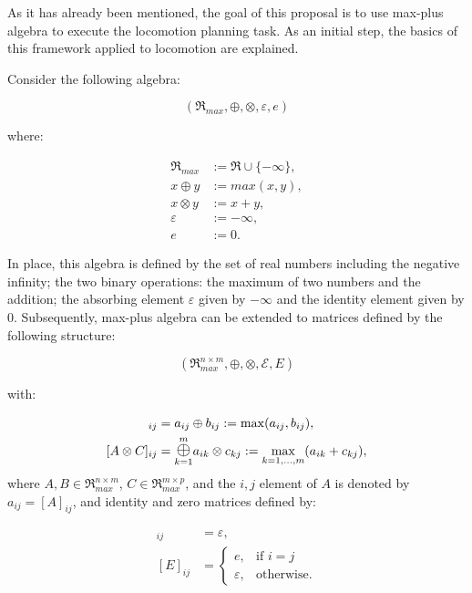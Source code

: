 \documentclass[main.tex]{subfiles}
\begin{document}
	
	As it has already been mentioned, the goal of this proposal is to use max-plus algebra to execute the locomotion planning task. As an initial step, the basics of this framework applied to locomotion are explained.
	
	Consider the following algebra:
	
	\begin{equation}
		(\Re_{max}, \oplus, \otimes, \varepsilon, e)
	\end{equation}
	
	where:
	
	\begin{align}
		\Re_{max} &:= \Re \cup \{-\infty\}, \nonumber\\
		x \oplus y &:= max(x,y), \nonumber\\
		x \otimes y &:= x + y, \nonumber\\
		\varepsilon &:= -\infty, \nonumber\\
		e &:= 0. \nonumber
	\end{align}
	
	In place, this algebra is defined by the set of real numbers including the negative infinity; the two binary operations: the maximum of two numbers and the addition; the absorbing element $\varepsilon$ given by $-\infty$ and the identity element given by $0$. Subsequently, max-plus algebra can be extended to matrices defined by the following structure:
	
	\begin{equation}
		(\Re_{max}^{n\times m}, \oplus, \otimes,\mathcal{E}, E)
	\end{equation}
	
	with:
	
	\begin{align}
		[A \oplus B]_{ij} &= a_{ij} \oplus b_{ij} := \max(a_{ij},b_{ij}), \nonumber \\
		[A \otimes C]_{ij} &= \underset{k=1}{\overset{m}{\mathlarger{\mathlarger\oplus}}}a_{ik} \otimes c_{kj} := \max\limits_{k=1,...,m}(a_{ik} + c_{kj}), \nonumber 
	\end{align}
	where $A,B \in \Re_{max}^{n\times m}$, $C \in \Re_{max}^{m\times p}$, and the $i,j$ element of $A$ is denoted by $a_{ij} = [A]_{ij}$, and identity and zero matrices defined by:
	
	\begin{align}
		[\mathcal{E}]_{ij} &= \varepsilon, \nonumber \\
		[E]_{ij} &= \begin{cases}
			e, & \text{if } i =j \\
			\varepsilon,& \text{otherwise.}
		\end{cases} \nonumber
	\end{align}
	
\end{document}
